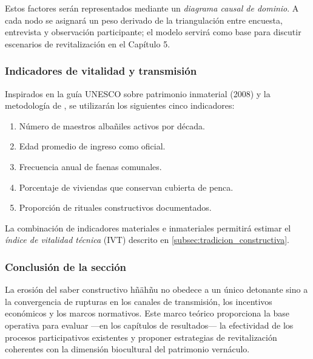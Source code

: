 Estos factores serán representados mediante un \emph{diagrama causal de
	dominio}.  A cada nodo se asignará un peso derivado de la triangulación
entre encuesta, entrevista y observación participante; el modelo
servirá como base para discutir escenarios de revitalización en el
Capítulo 5.

\subsubsection*{Indicadores de vitalidad y transmisión}

Inspirados en la guía UNESCO sobre patrimonio inmaterial (2008) y la
metodología de \cite{gandara2000}, se utilizarán los siguientes cinco
indicadores:

\begin{enumerate}
	\item Número de maestros albañiles activos por década.
	\item Edad promedio de ingreso como oficial.
	\item Frecuencia anual de faenas comunales.
	\item Porcentaje de viviendas que conservan cubierta de penca.
	\item Proporción de rituales constructivos documentados.
\end{enumerate}

La combinación de indicadores materiales e inmateriales permitirá
estimar el \emph{índice de vitalidad técnica} (IVT) descrito en
\autoref{subsec:tradicion_constructiva}.

\subsubsection*{Conclusión de la sección}

La erosión del saber constructivo hñähñu no obedece a un único detonante
sino a la convergencia de rupturas en los canales de transmisión, los
incentivos económicos y los marcos normativos.  Este marco teórico
proporciona la base operativa para evaluar —en los capítulos de
resultados— la efectividad de los procesos participativos existentes y
proponer estrategias de revitalización coherentes con la dimensión
biocultural del patrimonio vernáculo.

